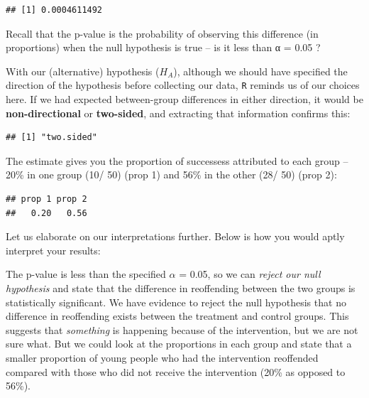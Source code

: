 \documentclass[
]{book}
\newenvironment{Shaded}{\begin{snugshade}}{\end{snugshade}}
\newcommand{\NormalTok}[1]{#1}
\newcommand{\SpecialCharTok}[1]{\textcolor[rgb]{0.00,0.00,0.00}{#1}}
\begin{document}
\begin{verbatim}
## [1] 0.0004611492
\end{verbatim}

Recall that the p-value is the probability of observing this difference (in proportions) when the null hypothesis is true -- is it less than α = 0.05 ?

With our (alternative) hypothesis (\(H_A\)), although we should have specified the direction of the hypothesis before collecting our data, \texttt{R} reminds us of our choices here. If we had expected between-group differences in either direction, it would be \textbf{non-directional} or \textbf{two-sided}, and extracting that information confirms this:

\begin{Shaded}
\end{Shaded}

\begin{verbatim}
## [1] "two.sided"
\end{verbatim}

The estimate gives you the proportion of successess attributed to each group -- 20\% in one group (10/ 50) (prop 1) and 56\% in the other (28/ 50) (prop 2):

\begin{Shaded}
\end{Shaded}

\begin{verbatim}
## prop 1 prop 2 
##   0.20   0.56
\end{verbatim}

Let us elaborate on our interpretations further. Below is how you would aptly interpret your results:

The p-value is less than the specified \(\alpha\) = 0.05, so we can \emph{reject our null hypothesis} and state that the difference in reoffending between the two groups is statistically significant. We have evidence to reject the null hypothesis that no difference in reoffending exists between the treatment and control groups. This suggests that \emph{something} is happening because of the intervention, but we are not sure what. But we could look at the proportions in each group and state that a smaller proportion of young people who had the intervention reoffended compared with those who did not receive the intervention (20\% as opposed to 56\%).
\end{document}
